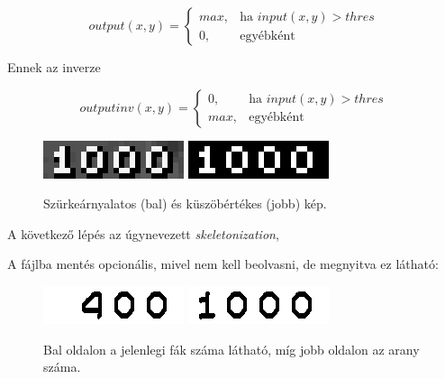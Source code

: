 
\begin{equation*}
    output(x,y) = \left\{ 
    \begin{matrix}
        max, & \text{ha } input(x,y) > thres \\
        0, & \text{egyébként}
    \end{matrix} \right.
\end{equation*}

Ennek az inverze

\begin{equation*}
    outputinv(x,y) = \left\{ 
    \begin{matrix}
        0, & \text{ha } input(x,y) > thres \\
        max, & \text{egyébként}
    \end{matrix} \right.
\end{equation*}

\begin{figure}[h]
    \centering
    \includegraphics[scale=1]{images/grey.png}
    \includegraphics[scale=1]{images/thres.png}
    \caption{Szürkeárnyalatos (bal) és küszöbértékes (jobb) kép.}
    \label{fig:numbers}
\end{figure}

A következő lépés az úgynevezett \textit{skeletonization}{\cite{skeletonization}}, 

A fájlba mentés opcionális, mivel nem kell beolvasni, de megnyitva ez látható: 

\begin{figure}[h]
    \centering
    \includegraphics[scale=1]{images/Lumber.png}
    \includegraphics[scale=1]{images/Gold.png}
    \caption{Bal oldalon a jelenlegi fák száma látható, míg jobb oldalon az arany száma. }
    \label{fig:numbers}
\end{figure}

